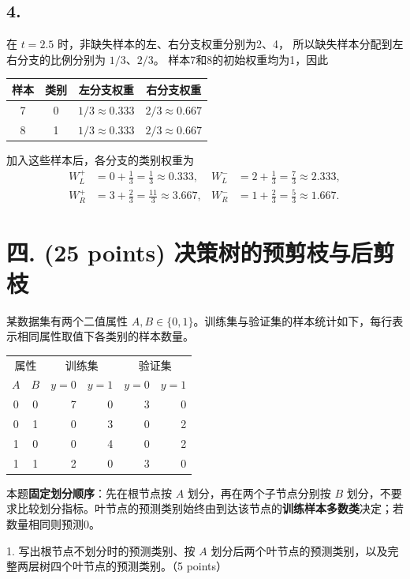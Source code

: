 \documentclass[10pt]{article}
\begin{document}
\subsection*{4.}
在 $t=2.5$ 时，非缺失样本的左、右分支权重分别为2、4，
所以缺失样本分配到左右分支的比例分别为 $1/3$、$2/3$。
样本7和8的初始权重均为1，因此
\begin{center}
\begin{tabular}{c|c|cc}
\toprule
样本 & 类别 & 左分支权重 & 右分支权重\\
\midrule
7 & 0 & $1/3\approx0.333$ & $2/3\approx0.667$\\
8 & 1 & $1/3\approx0.333$ & $2/3\approx0.667$\\
\bottomrule
\end{tabular}
\end{center}
加入这些样本后，各分支的类别权重为
\begin{align*}
W_L^+&=0+\frac13=\frac13\approx0.333,&
W_L^-&=2+\frac13=\frac73\approx2.333,\\
W_R^+&=3+\frac23=\frac{11}{3}\approx3.667,&
W_R^-&=1+\frac23=\frac53\approx1.667.
\end{align*}


\newpage
\section*{四. (25 points) 决策树的预剪枝与后剪枝}
某数据集有两个二值属性 $A,B\in\{0,1\}$。训练集与验证集的样本统计如下，每行表示相同属性取值下各类别的样本数量。
\begin{center}
\begin{tabular}{ccrrrr}
\toprule
\multicolumn{2}{c}{属性} & \multicolumn{2}{c}{训练集} & \multicolumn{2}{c}{验证集} \\
$A$ & $B$ & $y=0$ & $y=1$ & $y=0$ & $y=1$ \\
\midrule
0 & 0 & 7 & 0 & 3 & 0 \\
0 & 1 & 0 & 3 & 0 & 2 \\
1 & 0 & 0 & 4 & 0 & 2 \\
1 & 1 & 2 & 0 & 3 & 0 \\
\bottomrule
\end{tabular}
\end{center}
本题\textbf{固定划分顺序}：先在根节点按 $A$ 划分，再在两个子节点分别按 $B$ 划分，不要求比较划分指标。叶节点的预测类别始终由到达该节点的\textbf{训练样本多数类}决定；若数量相同则预测0。

1. 写出根节点不划分时的预测类别、按 $A$ 划分后两个叶节点的预测类别，以及完整两层树四个叶节点的预测类别。（5 points）
\end{document}
